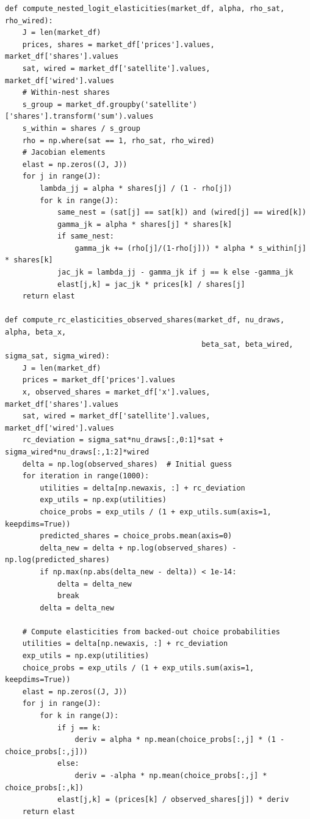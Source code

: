 \documentclass[english,11pt]{article}
\begin{document}
\begin{verbatim}
def compute_nested_logit_elasticities(market_df, alpha, rho_sat, rho_wired):
    J = len(market_df)
    prices, shares = market_df['prices'].values, market_df['shares'].values
    sat, wired = market_df['satellite'].values, market_df['wired'].values
    # Within-nest shares
    s_group = market_df.groupby('satellite')['shares'].transform('sum').values
    s_within = shares / s_group
    rho = np.where(sat == 1, rho_sat, rho_wired)
    # Jacobian elements
    elast = np.zeros((J, J))
    for j in range(J):
        lambda_jj = alpha * shares[j] / (1 - rho[j])
        for k in range(J):
            same_nest = (sat[j] == sat[k]) and (wired[j] == wired[k])
            gamma_jk = alpha * shares[j] * shares[k]
            if same_nest:
                gamma_jk += (rho[j]/(1-rho[j])) * alpha * s_within[j] * shares[k]
            jac_jk = lambda_jj - gamma_jk if j == k else -gamma_jk
            elast[j,k] = jac_jk * prices[k] / shares[j]
    return elast
    
def compute_rc_elasticities_observed_shares(market_df, nu_draws, alpha, beta_x, 
                                             beta_sat, beta_wired, sigma_sat, sigma_wired):
    J = len(market_df)
    prices = market_df['prices'].values
    x, observed_shares = market_df['x'].values, market_df['shares'].values
    sat, wired = market_df['satellite'].values, market_df['wired'].values
    rc_deviation = sigma_sat*nu_draws[:,0:1]*sat + sigma_wired*nu_draws[:,1:2]*wired
    delta = np.log(observed_shares)  # Initial guess
    for iteration in range(1000):
        utilities = delta[np.newaxis, :] + rc_deviation
        exp_utils = np.exp(utilities)
        choice_probs = exp_utils / (1 + exp_utils.sum(axis=1, keepdims=True))
        predicted_shares = choice_probs.mean(axis=0)
        delta_new = delta + np.log(observed_shares) - np.log(predicted_shares)
        if np.max(np.abs(delta_new - delta)) < 1e-14:
            delta = delta_new
            break
        delta = delta_new
        
    # Compute elasticities from backed-out choice probabilities
    utilities = delta[np.newaxis, :] + rc_deviation
    exp_utils = np.exp(utilities)
    choice_probs = exp_utils / (1 + exp_utils.sum(axis=1, keepdims=True))
    elast = np.zeros((J, J))
    for j in range(J):
        for k in range(J):
            if j == k:
                deriv = alpha * np.mean(choice_probs[:,j] * (1 - choice_probs[:,j]))
            else:
                deriv = -alpha * np.mean(choice_probs[:,j] * choice_probs[:,k])
            elast[j,k] = (prices[k] / observed_shares[j]) * deriv
    return elast


\end{verbatim}
\end{document}
